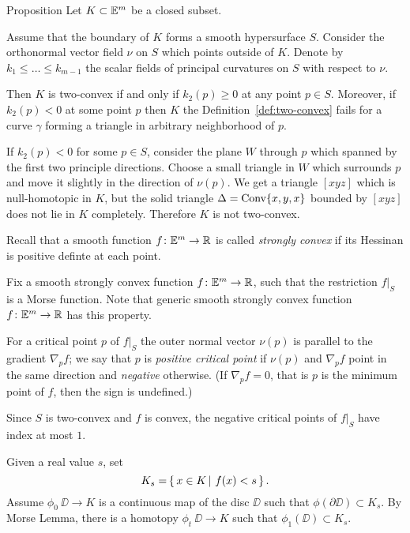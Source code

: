 \begin{thm}{Proposition}\label{prop:two-cove+smooth}
Let $K\subset \EE^m$ be a closed subset.

Assume that the boundary of $K$ forms a smooth hypersurface $S$.
Consider the orthonormal vector field $\nu$ on $S$ which points outside of $K$.
Denote by $k_1\le \dots\le k_{m-1}$ the scalar fields of principal curvatures on $S$ with respect to $\nu$.

Then $K$ is two-convex if and only if $k_2(p)\ge 0$ at any point $p\in S$.
Moreover, if $k_2(p)<0$ at some point $p$ then $K$ the Definition~\ref{def:two-convex} fails for a curve $\gamma$ forming a triangle in arbitrary neighborhood of $p$.
\end{thm}

If $k_2(p)<0$ for some $p\in S$,
consider the plane $W$ through $p$ which spanned by the first two principle directions.
Choose a small triangle in $W$ which surrounds $p$ and move it slightly in the direction of $\nu(p)$.
We get a triangle $[xyz]$ which is null-homotopic in $K$,
but the solid triangle $\Delta=\mathop{\rm Conv}\nolimits\{x,y,x\}$ bounded by $[xyz]$ does not lie in $K$ completely.
Therefore $K$ is not two-convex.

Recall that a smooth function $f\:\EE^m\to\RR$ is called \emph{strongly convex} if its Hessinan is
 positive definte at each point.

Fix a smooth strongly
convex function $f\:\EE^m\to\RR$,
such that the restriction $f|_S$ is a Morse function.
Note that generic smooth strongly convex function $f\:\EE^m\to\RR$ has this property.

For a critical point $p$ of $f|_S$ the outer normal vector $\nu(p)$ is parallel to the gradient $\nabla_pf$;
we say that $p$ is \emph{positive critical point}
if $\nu(p)$ and $\nabla_p f$ point in the same direction 
and \emph{negative} otherwise.
(If $\nabla_pf=0$, that is $p$ is the minimum point of $f$, then the sign is undefined.)

Since $S$ is two-convex and $f$ is convex, 
the negative critical points of $f|_S$
have index at most $1$.

Given a real value $s$, set 
\[K_s=\set{x\in K}{f(x)<s}.\]
Assume  $\phi_0\:\DD\to K$ is a continuous map of the disc $\DD$
such that $\phi(\partial \DD)\subset K_s$.
By Morse Lemma, 
there is a homotopy $\phi_t\:\DD\to K$ such that 
$\phi_1(\DD)\subset K_s$.

